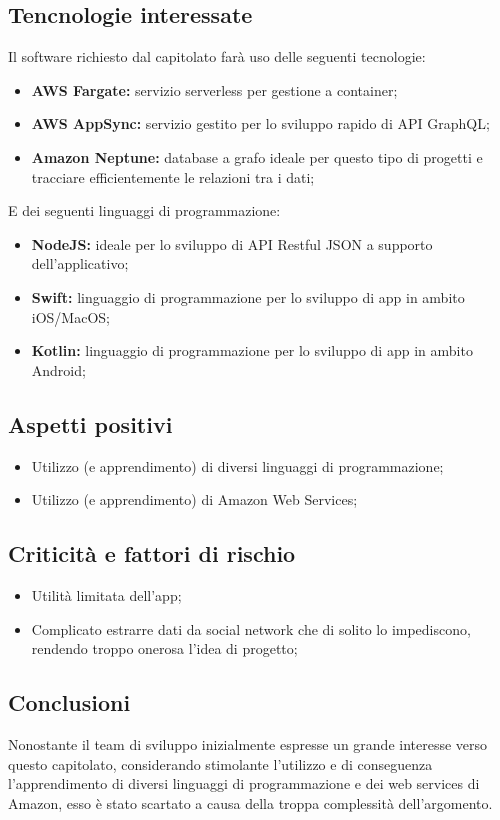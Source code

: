 \subsection{Tencnologie interessate}
    Il software richiesto dal capitolato farà uso delle seguenti tecnologie:
    \begin{itemize}
        \item \textbf{AWS Fargate:} servizio serverless per gestione a container;
        \item \textbf{AWS AppSync:} servizio gestito per lo sviluppo rapido di API GraphQL;
        \item \textbf{Amazon Neptune:} database a grafo ideale per questo tipo di progetti e tracciare efficientemente le relazioni tra i dati;
    \end{itemize}
    E dei seguenti linguaggi di programmazione:
    \begin{itemize}
        \item \textbf{NodeJS:} ideale per lo sviluppo di API Restful JSON a supporto dell’applicativo;
        \item \textbf{Swift:} linguaggio di programmazione per lo sviluppo di app in ambito iOS/MacOS;
        \item \textbf{Kotlin:} linguaggio di programmazione per lo sviluppo di app in ambito Android;
    \end{itemize}

\subsection{Aspetti positivi}
    \begin{itemize}
        \item Utilizzo (e apprendimento) di diversi linguaggi di programmazione;
        \item Utilizzo (e apprendimento) di Amazon Web Services;
    \end{itemize}

\subsection{Criticità e fattori di rischio}
    \begin{itemize}
        \item Utilità limitata dell'app;
        \item Complicato estrarre dati da social network che di solito lo impediscono, rendendo troppo onerosa l'idea di progetto;
    \end{itemize}
    
\subsection{Conclusioni}
Nonostante il team di sviluppo inizialmente espresse un grande interesse verso questo capitolato, considerando stimolante l'utilizzo e di conseguenza l'apprendimento di diversi linguaggi di programmazione e dei web services di Amazon, esso è stato scartato a causa della troppa complessità dell'argomento.